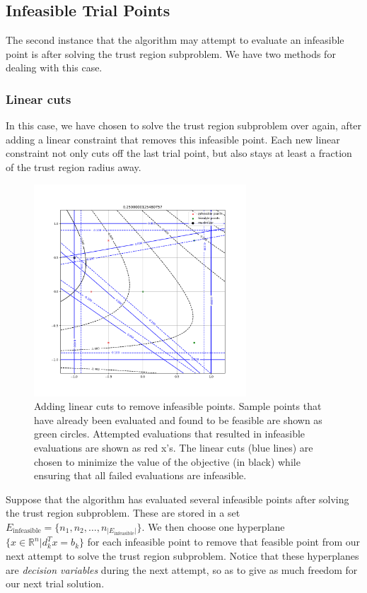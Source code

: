 \documentclass{article}
\theoremstyle{case}
\numberwithin{theorem}{subsection}
\newcommand{\Rn}{\mathbb R^n}
\newcommand{\trsinfset}{{E_\textrm{infeasible}}}
\begin{document}
\subsection{Infeasible Trial Points}
\label{convex_model_reduction}

The second instance that the algorithm may attempt to evaluate an infeasible point is after solving the trust region subproblem.
We have two methods for dealing with this case.

\subsubsection{Linear cuts}
\label{linear_cuts_section}
In this case, we have chosen to solve the trust region subproblem over again, after adding a linear constraint that removes this infeasible point.
Each new linear constraint not only cuts off the last trial point, but also stays at least a fraction of the trust region radius away.

\begin{figure}[h]
    \centering
    \includegraphics[width=300px]{images/pyomo_cut_solution.png}
    \caption{
		Adding linear cuts to remove infeasible points.
		Sample points that have already been evaluated and found to be feasible are shown as green circles.
		Attempted evaluations that resulted in infeasible evaluations are shown as red x's.
		The linear cuts (blue lines) are chosen to minimize the value of the objective (in black) while ensuring that all failed evaluations are infeasible.
	}
    \label{pvip}
\end{figure}


Suppose that the algorithm has evaluated several infeasible points after solving the trust region subproblem.
These are stored in a set $\trsinfset = \{n_1, n_2, \ldots, n_{|\trsinfset|}\}$.
We then choose one hyperplane $\{x \in \Rn | d_k^Tx = b_k\}$ for each infeasible point to remove that feasible point from our next attempt to solve the trust region subproblem.
Notice that these hyperplanes are \emph{decision variables} during the next attempt, so as to give as much freedom for our next trial solution.
\end{document}
